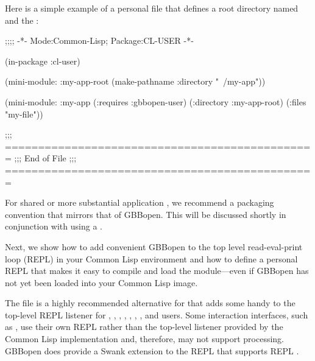 \documentclass[10pt,twoside,english,pdftex]{article}
\begin{document}
Here is a simple example of a personal
 file that defines a root directory
named  and the  :
%
\W\supp
\begin{example}
  ;;;; -*- Mode:Common-Lisp; Package:CL-USER -*-

  (in-package :cl-user)

  (mini-module: :my-app-root 
      (make-pathname :directory "~/my-app"))    

  (mini-module: :my-app
    (:requires :gbbopen-user)
    (:directory :my-app-root)
    (:files "my-file"))

  ;;; ===============================================
  ;;;   End of File
  ;;; ===============================================
\end{example}

For shared or more substantial application , we recommend a
packaging convention that mirrors that of GBBopen.  This will be discussed
shortly in conjunction with using a .

Next, we show how to add convenient GBBopen  to the
top level read-eval-print loop (REPL) in your Common Lisp environment and how
to define a personal REPL  that makes it easy to compile and
load the  module---even if GBBopen has not yet been loaded into
your Common Lisp image.

%
%
%
The file  is a highly
recommended alternative for 
that adds some handy  to the top-level REPL listener
for
%
,
,
,
,
,
,
, and
%
users.  Some interaction interfaces, such as
, use their own REPL
rather than the top-level listener provided by the Common Lisp implementation
and, therefore, may not support  
processing.  GBBopen does provide a Swank extension to the
 REPL that supports
REPL .
\end{document}

